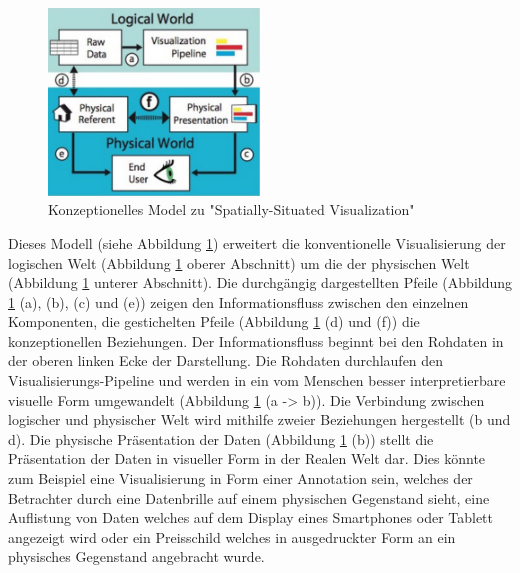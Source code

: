 \begin{figure}[H]
	\centering
	\includegraphics[width=0.5\textwidth]{resources/fundamentals/situated_visualization/spacially_situated_visualization_model.png}
	\caption{Konzeptionelles Model zu "Spatially-Situated Visualization" \cite{example_situated_visualization_concept}}
	\label{img:situated_visualization_concept}
\end{figure}

Dieses Modell (siehe Abbildung \ref{img:situated_visualization_concept}) erweitert die konventionelle Visualisierung der logischen Welt (Abbildung \ref{img:situated_visualization_concept} oberer Abschnitt) um die der physischen Welt (Abbildung \ref{img:situated_visualization_concept} unterer Abschnitt). 
Die durchgängig dargestellten Pfeile (Abbildung \ref{img:situated_visualization_concept} (a), (b), (c) und (e)) zeigen den Informationsfluss zwischen den einzelnen Komponenten, die gestichelten Pfeile (Abbildung \ref{img:situated_visualization_concept} (d) und (f)) die konzeptionellen Beziehungen. Der Informationsfluss beginnt bei den Rohdaten in der oberen linken Ecke der Darstellung. Die Rohdaten durchlaufen den Visualisierungs-Pipeline und werden in ein vom Menschen besser interpretierbare visuelle Form umgewandelt (Abbildung \ref{img:situated_visualization_concept} (a -> b)). Die Verbindung zwischen logischer und physischer Welt wird mithilfe zweier Beziehungen hergestellt (b und d). 
Die physische Präsentation der Daten (Abbildung \ref{img:situated_visualization_concept} (b)) stellt die Präsentation der Daten in visueller Form in der Realen Welt dar. 
Dies könnte zum Beispiel eine Visualisierung in Form einer Annotation sein, welches der Betrachter durch eine Datenbrille auf einem physischen Gegenstand sieht, eine Auflistung von Daten welches 
auf dem  Display eines Smartphones oder Tablett angezeigt wird oder ein Preisschild welches in ausgedruckter Form an ein physisches Gegenstand angebracht wurde.


